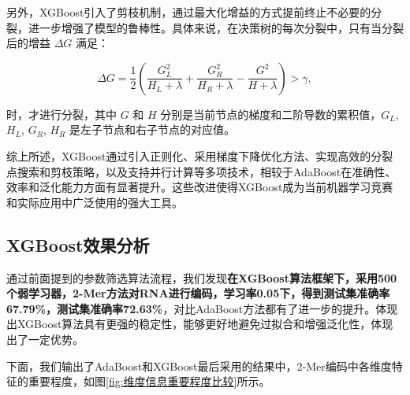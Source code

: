 \documentclass[a4paper,11pt,AutoFakeBold]{ctexart}
\begin{document}
另外，XGBoost引入了剪枝机制，通过最大化增益的方式提前终止不必要的分裂，进一步增强了模型的鲁棒性。具体来说，在决策树的每次分裂中，只有当分裂后的增益 $\Delta G$ 满足：

\begin{equation}
\Delta G = \frac{1}{2} \left( \frac{G_L^2}{H_L + \lambda} + \frac{G_R^2}{H_R + \lambda} - \frac{G^2}{H + \lambda} \right) > \gamma,
\end{equation}

时，才进行分裂，其中 $G$ 和 $H$ 分别是当前节点的梯度和二阶导数的累积值，$G_L$, $H_L$, $G_R$, $H_R$ 是左子节点和右子节点的对应值。

综上所述，XGBoost通过引入正则化、采用梯度下降优化方法、实现高效的分裂点搜索和剪枝策略，以及支持并行计算等多项技术，相较于AdaBoost在准确性、效率和泛化能力方面有显著提升。这些改进使得XGBoost成为当前机器学习竞赛和实际应用中广泛使用的强大工具。

\subsection{XGBoost效果分析}
通过前面提到的参数筛选算法流程，我们发现\textbf{在XGBoost算法框架下，采用500个弱学习器，2-Mer方法对RNA进行编码，学习率0.05下，得到测试集准确率67.79\%，测试集准确率72.63\%}，对比AdaBoost方法都有了进一步的提升。体现出XGBoost算法具有更强的稳定性，能够更好地避免过拟合和增强泛化性，体现出了一定优势。

下面，我们输出了AdaBoost和XGBoost最后采用的结果中，2-Mer编码中各维度特征的重要程度，如图\ref{fig:维度信息重要程度比较}所示。
\end{document}
